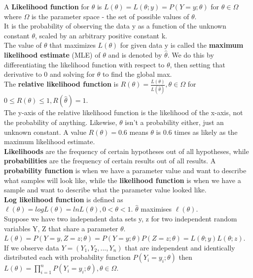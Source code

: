 \documentclass[a4paper,12pt]{article}
\begin{document}
A \textbf{Likelihood function} for $\theta$
is $L(\theta) = L(\theta; y) =  P(Y=y;\theta)$ for $\theta \in \Omega$ \\where $\Omega$ is the parameter space - the set of possible values of $\theta$.
\\It is the probability of observing the data y as a function of the unknown constant $\theta$, scaled by an arbitrary positive constant k.
\\

The value of $\theta$ that maximizes $L(\theta)$ for given data y is called the
\textbf{maximum likelihood estimate} (MLE) of $\theta$ and is denoted by $\hat{\theta}$. We do this by differentiating the likelihood function with respect to $\theta$, then setting that derivative to 0 and solving for 
$\theta$ to find the global max.
\\

The \textbf{relative likelihood function} is $R(\theta) = \frac{L(\theta)}{L(\hat{\theta})}, \theta \in \Omega$ for $0 \leq R(\theta) \leq 1, R(\hat{\theta}) = 1$.
\\The y-axis of the relative likelihood function is the likelihood of the x-axis, not the probability of anything. Likewise, 
$\theta$ isn't a probability either, just an unknown constant. A value $R(\theta) = 0.6 $ means $\theta $ is 0.6 times as likely as the maximum likelihood estimate.
\\

\textbf{Likelihoods} are the frequency of certain hypotheses out of all hypotheses, while \textbf{probabilities} are the frequency of certain results out of all results. A \textbf{probability function} is when we have a parameter value and want to describe what samples will look like, while the \textbf{likelihood function} is  when we have a sample and want to describe what the parameter value looked like.
\\

\textbf{Log likelihood function} is defined as $\ell(\theta) = logL(\theta) = lnL(\theta), 0 < \theta < 1$. $\hat{\theta}$ maximises $\ell(\theta)$.
\\

Suppose we have two independent data sets 
y, z for two independent random variables 
Y, Z that share a parameter $\theta$. $L(\theta) = P(Y = y, Z = z; \theta) = P(Y = y; \theta)P(Z = z; \theta) = L(\theta;y)L(\theta;z)$.
\\If we observe data $Y = (Y_1, Y_2, ..., Y_n)$ that are independent and identically distributed each with
probability function $P(Y_i = y_i ; \theta)$ then $L(\theta) = \prod_{i=1}^n P(Y_i = y_i ; \theta), \theta \in \Omega$.
\\
\end{document}
